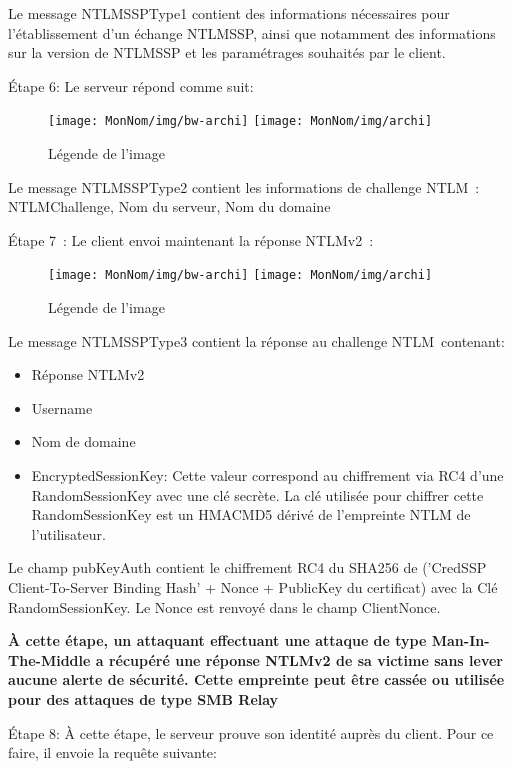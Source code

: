 Le message NTLMSSPType1 contient des informations nécessaires pour l’établissement d’un échange NTLMSSP, ainsi que notamment des informations sur la version de NTLMSSP et les paramétrages souhaités par le client.

Étape 6: Le serveur répond comme suit:

\begin{figure}[ht]
  \centering
  \ifssticbw
    \texttt{[image: MonNom/img/bw-archi]}
  \else
    \texttt{[image: MonNom/img/archi]}
  \fi
  \caption{Légende de l'image}
  \label{fig:monnom:archi}
\end{figure}

Le message NTLMSSPType2 contient les informations de challenge NTLM : NTLMChallenge, Nom du serveur, Nom du domaine

Étape 7 :
Le client envoi maintenant la réponse NTLMv2 :

\begin{figure}[ht]
  \centering
  \ifssticbw
    \texttt{[image: MonNom/img/bw-archi]}
  \else
    \texttt{[image: MonNom/img/archi]}
  \fi
  \caption{Légende de l'image}
  \label{fig:monnom:archi}
\end{figure}

Le message NTLMSSPType3 contient la réponse au challenge NTLM contenant:
\begin{itemize}
	\item Réponse NTLMv2
	\item Username
	\item Nom de domaine
	\item EncryptedSessionKey: Cette valeur correspond au chiffrement via RC4 d’une RandomSessionKey avec une clé secrète. La clé utilisée pour chiffrer cette RandomSessionKey est un HMACMD5 dérivé de l'empreinte NTLM de l’utilisateur.
\end{itemize}
Le champ pubKeyAuth contient le chiffrement RC4 du SHA256 de (’CredSSP Client-To-Server Binding Hash’ + Nonce + PublicKey du certificat) avec la Clé RandomSessionKey.
Le Nonce est renvoyé dans le champ ClientNonce.

\textbf{À cette étape, un attaquant effectuant une attaque de type Man-In-The-Middle a récupéré une réponse NTLMv2 de sa victime sans lever aucune alerte de sécurité. Cette empreinte peut être cassée ou utilisée pour des attaques de type SMB Relay}

Étape 8: À cette étape, le serveur prouve son identité auprès du client. Pour ce faire, il envoie la requête suivante:

